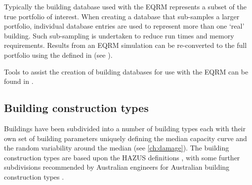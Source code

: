 Typically the building database used with
the EQRM represents a subset of the true portfolio of interest.
When creating a database that sub-samples a larger portfolio,
individual database entries are used to represent more than one
`real' building. Such sub-sampling is undertaken to reduce run
times and memory requirements. Results from an EQRM simulation can
be re-converted to the full portfolio using the \typesf defined in
 (see
).

Tools to assist the creation of building databases for use with the EQRM can be found in
.


\subsection{Building construction types}
\label{sec:grids-constructionclass}

Buildings have been subdivided into a number of building
types each with their own set of building
parameters uniquely defining the median capacity
curve and the random variability around the
median (see \cref{ch:damage}). The building construction types are
based upon the HAZUS definitions \citep{dr_FEMA99b}, with some
further subdivisions recommended by Australian engineers for
Australian building construction types \citep{dr_Stehle01a}.

